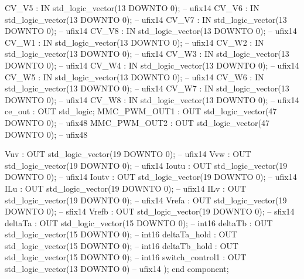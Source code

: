 \begin{mylisting}[language=VHDL,caption=トップモジュール,label=appF_Top_module_VHDL]
        CV_V5                             :   IN    std_logic_vector(13 DOWNTO 0);  -- ufix14
        CV_V6                             :   IN    std_logic_vector(13 DOWNTO 0);  -- ufix14
        CV_V7                             :   IN    std_logic_vector(13 DOWNTO 0);  -- ufix14
        CV_V8                             :   IN    std_logic_vector(13 DOWNTO 0);  -- ufix14
        CV_W1                             :   IN    std_logic_vector(13 DOWNTO 0);  -- ufix14
        CV_W2                             :   IN    std_logic_vector(13 DOWNTO 0);  -- ufix14
        CV_W3                             :   IN    std_logic_vector(13 DOWNTO 0);  -- ufix14
        CV_W4                             :   IN    std_logic_vector(13 DOWNTO 0);  -- ufix14
        CV_W5                             :   IN    std_logic_vector(13 DOWNTO 0);  -- ufix14
        CV_W6                             :   IN    std_logic_vector(13 DOWNTO 0);  -- ufix14
        CV_W7                             :   IN    std_logic_vector(13 DOWNTO 0);  -- ufix14
        CV_W8                             :   IN    std_logic_vector(13 DOWNTO 0);  -- ufix14
        ce_out                            :   OUT   std_logic;
        MMC_PWM_OUT1                      :   OUT   std_logic_vector(47 DOWNTO 0);  -- ufix48
        MMC_PWM_OUT2                      :   OUT   std_logic_vector(47 DOWNTO 0);  -- ufix48
		  
        Vuv                               :   OUT   std_logic_vector(19 DOWNTO 0);  -- ufix14
        Vvw                               :   OUT   std_logic_vector(19 DOWNTO 0);  -- ufix14
        Ioutu                             :   OUT   std_logic_vector(19 DOWNTO 0);  -- ufix14
        Ioutv                             :   OUT   std_logic_vector(19 DOWNTO 0);  -- ufix14
        ILu                               :   OUT   std_logic_vector(19 DOWNTO 0);  -- ufix14
        ILv                               :   OUT   std_logic_vector(19 DOWNTO 0);  -- ufix14
        Vrefa                             :   OUT   std_logic_vector(19 DOWNTO 0);  -- sfix14
        Vrefb                             :   OUT   std_logic_vector(19 DOWNTO 0);  -- sfix14
        deltaTa                           :   OUT   std_logic_vector(15 DOWNTO 0);  -- int16
        deltaTb                           :   OUT   std_logic_vector(15 DOWNTO 0);  -- int16
        deltaTa_hold                      :   OUT   std_logic_vector(15 DOWNTO 0);  -- int16
        deltaTb_hold                      :   OUT   std_logic_vector(15 DOWNTO 0);  -- int16
        switch_control1                   :   OUT   std_logic_vector(13 DOWNTO 0)  -- ufix14
        );
		end component;



\end{mylisting}
